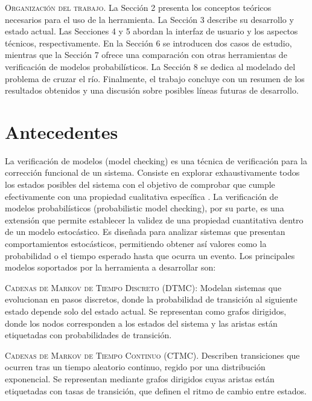 \documentclass[runningheads]{llncs}
\begin{document}
\vspace{.5em}

\textsc{Organización del trabajo}. La Sección 2 presenta los conceptos teóricos necesarios para el uso de la herramienta. La Sección 3 describe su desarrollo y estado actual. Las Secciones 4 y 5 abordan la interfaz de usuario y los aspectos técnicos, respectivamente. En la Sección 6 se introducen dos casos de estudio, mientras que la Sección 7 ofrece una comparación con otras herramientas de verificación de modelos probabilísticos. La Sección 8 se dedica al modelado del problema de cruzar el río. Finalmente, el trabajo concluye con un resumen de los resultados obtenidos y una discusión sobre posibles líneas futuras de desarrollo.

\section{Antecedentes}
La verificación de modelos (model checking) es una técnica de verificación para la corrección funcional de un sistema. Consiste en explorar exhaustivamente todos los estados posibles del sistema con el objetivo de comprobar que cumple efectivamente con una propiedad cualitativa específica \cite{BK07}. La verificación de modelos probabilísticos (probabilistic model checking), por su parte, es una extensión que permite establecer la validez de una propiedad cuantitativa dentro de un modelo estocástico. Es diseñada para analizar sistemas que presentan comportamientos estocásticos, permitiendo obtener así valores como la probabilidad o el tiempo esperado hasta que ocurra un evento. Los principales modelos soportados por la herramienta a desarrollar son:

\vspace{.5em}

\textsc{Cadenas de Markov de Tiempo Discreto (DTMC)}: Modelan sistemas que evolucionan en pasos discretos, donde la probabilidad de transición al siguiente estado depende solo del estado actual. Se representan como grafos dirigidos, donde los nodos corresponden a los estados del sistema y las aristas están etiquetadas con probabilidades de transición.

\vspace{.5em}

\textsc{Cadenas de Markov de Tiempo Continuo (CTMC)}. Describen transiciones que ocurren tras un tiempo aleatorio continuo, regido por una distribución exponencial. Se representan mediante grafos dirigidos cuyas aristas están etiquetadas con tasas de transición, que definen el ritmo de cambio entre estados.
\end{document}
